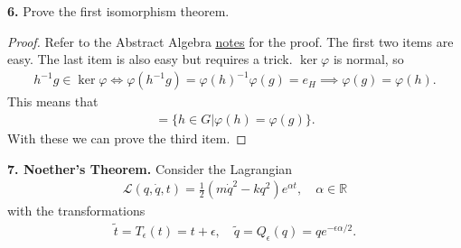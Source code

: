 \documentclass{book}
\theoremstyle{definition}
\newcommand{\R}{\mathbb{R}}
\newcommand{\lag}{\mathcal{L}}
\newcommand{\al}{\alpha}
\newcommand{\ep}{\epsilon}
\newcommand{\f}[2]{\frac{#1}{#2}}
\newcommand{\td}[1]{\tilde{#1}}
\newcommand{\lp}{\left(}
\newcommand{\rp}{\right)}
\begin{document}
\noindent \textbf{6.} Prove the first isomorphism theorem.

\begin{proof}
	Refer to the Abstract Algebra \href{https://huanqbui.com/archives/MA333.pdf}{\underline{notes}} for the proof. The first two items are easy. The last item is also easy but requires a trick. $\ker\varphi$ is normal, so 
	\begin{align}
	h^{-1}g \in \ker\varphi \iff \varphi(h^{-1}g) = \varphi(h)^{-1}\varphi(g)  = e_H \implies \varphi(g) = \varphi(h).
	\end{align}
	This means that 
	\begin{align}
	[g] = \{ h\in G \vert \varphi(h) = \varphi(g)   \}. 
	\end{align}
	With these we can prove the third item. 
\end{proof}




\noindent \textbf{7. Noether's Theorem.}  Consider the Lagrangian
\begin{align}
\lag(q,\dot{q},t) = \f{1}{2}\lp m\dot{q}^2 - kq^2 \rp e^{\al t}, \quad \al \in \R
\end{align}
with the transformations
\begin{align}
\td{t} = T_\ep(t) = t+\ep, \quad \td{q} = Q_\ep(q) = qe^{-\ep\al/2}.
\end{align}
\end{document}
